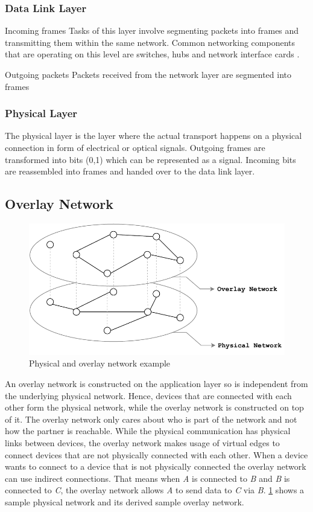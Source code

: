 \subsubsection{Data Link Layer}
Incoming frames\newline
Tasks of this layer involve segmenting packets into frames and transmitting them within the same network.
Common networking components that are operating on this level are switches, hubs and network interface cards \cite{simoneau2006}.

Outgoing packets\newline
Packets received from the network layer are segmented into frames 

\subsubsection{Physical Layer}
The physical layer is the layer where the actual transport happens on a physical connection in form of electrical or optical signals.
Outgoing frames are transformed into bits (0,1) which can be represented as a signal.
Incoming bits are reassembled into frames and handed over to the data link layer.

\subsection{Overlay Network}

\begin{figure}[htb!]
\centering
\includegraphics[width=.5\textwidth]{graphics/physical-vs-overlay-network.pdf}
\caption{Physical and overlay network example}
\label{fig:overlay}
\end{figure}

An overlay network is constructed on the application layer so is independent from the underlying physical network. 
Hence, devices that are connected with each other form the physical network, while the overlay network is constructed on top of it. The overlay network only cares about who is part of the network and not how the partner is reachable. 
While the physical communication has physical links between devices, the overlay network makes usage of virtual edges to connect devices that are not physically connected with each other. When a device wants to connect to a device that is not physically connected the overlay network can use indirect connections. That means when \textit{A} is connected to \textit{B} and \textit{B} is connected to \textit{C}, the overlay network allows \textit{A} to send data to \textit{C} via \textit{B}.
\cref{fig:overlay} shows a sample physical network and its derived sample overlay network.


